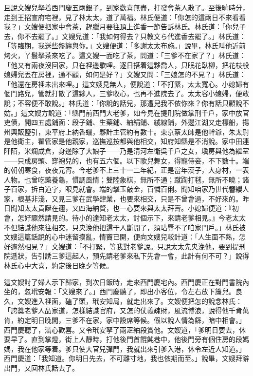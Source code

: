 且說文嫂兒拏着西門慶五兩銀子，到家歡喜無盡，打發會茶人散了。至後晌時分，走到王招宣府宅裡，見了林太太，道了萬福。林氏便道：「你怎的這兩日不來看看我？」文嫂便把家中會茶，趕臘月要往頂上進香一節告訴林氏。林氏道：「你兒子去，你不去罷了。」文嫂兒道：「我如何得去？只教文ら代進香去罷了。」林氏道：「等臨期，我送些盤纏與你。」文嫂便道：「多謝太太布施。」說畢，林氏叫他近前烤火，丫鬟拏茶來吃了。這文嫂一面吃了茶，問道：「三爹不在家了？」林氏道：「他又有兩夜沒回家，只在裡邊歇哩。逐日搭着這夥喬人，只眠花臥柳，把花枝般媳婦兒丟在房裡，通不顧，如何是好？」文嫂又問：「三娘怎的不見？」林氏道：「他還在房裡未出來哩。」這文嫂見無人，便說道：「不打緊，太太寬心。小媳婦有個門路兒，管就打散了這夥人，三爹收心，也再不進院去了。太太容小媳婦，便敢說；不容便不敢說。」{}林氏道：「你說的話兒，那遭兒我不依你來？你有話只顧說不妨。」這文嫂方說道：「縣門前西門大老爹，如今見在提刑院做掌刑千戶，家中放官吏債，開四五處鋪面：段子鋪、生藥鋪、紬絹鋪、絨線鋪，外邊江湖又走標船，揚州興販鹽引，東平府上納香蠟，夥計主管約有數十。東京蔡太師是他幹爺，朱太尉是他衛主，翟管家是他親家，巡撫巡按都與他相交，知府知縣是不消說。家中田連阡陌，米爛成倉{}，身邊除了大娘子——乃是清河左衛吳千戶之女，塡房與他為繼室——只成房頭、穿袍兒的，也有五六個。以下歌兒舞女，得寵侍妾，不下數十。端的朝朝寒食，夜夜元宵。今老爹不上三十一二年紀，正是當年漢子，大身材，一表人物。也曾吃藥養龜，慣調風情；{}雙陸象棋，無所不通；蹴踘打毬，無所不曉；諸子百家，拆白道字，眼見就會。端的擊玉敲金，百憐百俐。聞知咱家乃世代簪纓人家，根基非淺，又見三爹在武學肄業，也要來相交，只是不曾會過，不好來的。昨日聞知太太貴誕在邇，又四海納賢，{}也一心要來與太太拜壽。小媳婦便道：『初會，怎好驟然請見的。待小的達知老太太，討個示下，來請老爹相見。』今老太太不但結識他來往相交，只央浼他把這干人斷開了，須玷辱不了咱家門戶。」林氏被文嫂這篇話說的心中迷留摸亂，情竇已開，便向文嫂兒較計道：「人生面不熟，怎好遽然相見？」文嫂道：「不打緊，等我對老爹說。只說太太先央浼他，要到提刑院遞狀，告引誘三爹這起人，預先請老爹來私下先會一會，此計有何不可？」說得林氏心中大喜，約定後日晚夕等候。

這文嫂討了婦人示下歸家，到次日飯時，走來西門慶宅內。西門慶正在對門書院內坐的，忽玳安報：「文嫂來了。」西門慶聽了，即出小客位，令左右放下簾兒。良久，文嫂進入裡面，磕了頭，玳安知局，就走出來了。文嫂便把怎的說念林氏：「誇獎老爹人品家道，怎樣結識官府，又怎的仗義疎財，風流博浪，說得他千肯萬肯，約定明日晚間，三爹不在家，家中設席等候。假以說人情為繇，暗中相會。」西門慶聽了，滿心歡喜。又令玳安拏了兩疋紬段賞他。文嫂道，「爹明日要去，休要早了。直到掌燈，街上人靜時，打他後門首餛飩巷中{}，他後門旁有個住房的段媽媽，我在他家等着。爹只使大官兒彈門，我就出來引爹入港，休令左近人知道。」西門慶道：「我知道。你明日先去，不可離寸地，我也依期而至。」說畢，文嫂拜辭出門，又回林氏話去了。

